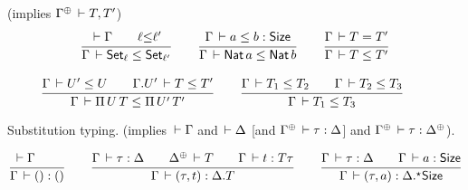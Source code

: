 \documentclass[acmlarge,review,anonymous]{acmart}\settopmatter{printfolios=true}
\begin{document}
 (implies $\resurrect \Gamma \der T,T'$)
\begin{gather*}
  \ru{\der \Gamma \qquad \ell {\leq} \ell'
    }{\Gamma \der \Set[\ell] \leq \Set[\ell']}
\qquad
  \ru{\Gamma \der a \leq b : \Size
    }{\Gamma \der \Nat a \leq \Nat b}
\qquad
  \ru{\Gamma \der T = T'
    }{\Gamma \der T \leq T'}
\\[2ex]
  \ru{\Gamma \der U' \leq U \qquad
      \cext \Gamma {U'} \der T \leq T'
    }{\Gamma \der \piT U T \leq \piT {U'} {T'}}
\qquad
  \ru{\Gamma \der T_1 \leq T_2 \qquad
      \Gamma \der T_2 \leq T_3
    }{\Gamma \der T_1 \leq T_3}
\qquad
\end{gather*}

Substitution typing. %
\fbox{$\Gamma \der \tau : \Delta$}
(implies $\,\vdash \Gamma$ and $\,\vdash \Delta$
 [and $\resurrect\Gamma \der \tau : \Delta$]
 and $\resurrect\Gamma \der \tau : \resurrect \Delta$).

\begin{gather*}
  \ru{\der \Gamma \qquad
    }{\Gamma \der \sempty : \cempty}
\qquad
  \ru{\Gamma \der \tau : \Delta \qquad
      \resurrect \Delta \der T \qquad
      \Gamma \der t : T \tau
    }{\Gamma \der \sext \tau t : \cext \Delta T}
\qquad
  \ru{\Gamma \der \tau : \Delta \qquad
      \Gamma \der a : \Size
    }{\Gamma \der \sext \tau a : \eext \Delta \Size}
\end{gather*}



\end{document}
